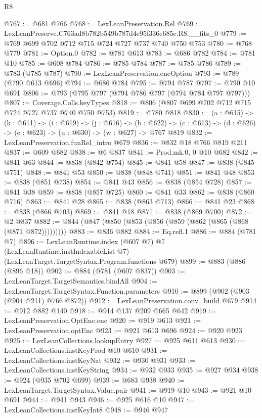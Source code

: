 \begin{lexlean}{R8}
\begin{coremodule}
@767 := @681 @766
@768 := LexLeanPreservation.Rel
@769 := LexLeanPreserve.C763ad8b782b549b787d4e95f336e685e.R8.__fits_0
@779 := @769 @699 @702 @712 @715 @724 @727 @737 @740 @750 @753
@780 := @768 @779
@781 := Option.{0}
@782 := @781 @613
@783 := @686 @782
@784 := @781 @10
@785 := @608 @784
@786 := @785 @784
@787 := @785 @786
@789 := @783 (@785 @787)
@790 := LexLeanPreservation.encOption
@793 := @789 (@790 @613 @696)
@794 := @686 @784
@795 := @794 @787
@797 := @790 @10 @691
@806 := @793 (@795 @797 (@794 @786 @797 (@794 @784 @797 @797)))
@807 := Coverage.Colls.keyTypes
@818 := @806 (@807 @699 @702 @712 @715 @724 @727 @737 @740 @750 @753)
@819 := @780 @818
@830 := (a : @615) ->
  (k : @611) ->
  (i : @619) ->
  (j : @616) ->
  (b : @622) -> (c : @613) -> (d : @626) -> (e : @623) -> (u : @630) -> (w : @627) -> @767 @819
@832 := LexLeanPreservation.funRel_intro @679
@836 := @832 @18 @766 @819 @211
@837 := @609 @682
@838 := @6 @837
@841 := Prod.mk.{0, 0} @10 @682
@842 := @841 @63
@844 := @838 (@842 @754)
@845 := @841 @58
@847 := @838 (@845 @751)
@848 := @841 @53
@850 := @838 (@848 @741)
@851 := @841 @48
@853 := @838 (@851 @738)
@854 := @841 @43
@856 := @838 (@854 @728)
@857 := @841 @38
@859 := @838 (@857 @725)
@860 := @841 @33
@862 := @838 (@860 @716)
@863 := @841 @28
@865 := @838 (@863 @713)
@866 := @841 @23
@868 := @838 (@866 @703)
@869 := @841 @18
@871 := @838 (@869 @700)
@872 := @2 @837
@882 := @844 (@847 (@850 (@853 (@856 (@859 (@862 (@865 (@868 (@871 @872)))))))))
@883 := @836 @882
@884 := Eq.refl.{1}
@886 := @884 (@781 @7)
@896 := LexLeanRuntime.index
    (@607 @7)
    @7
    (LexLeanRuntime.instIndexableList @7)
    (LexLeanTarget.TargetSyntax.Program.functions @679)
@899 := @883 (@886 (@896 @18))
@902 := @884 (@781 (@607 @837))
@903 := LexLeanTarget.TargetSemantics.bindAll
@904 := LexLeanTarget.TargetSyntax.Function.parameters
@910 := @899 (@902 (@903 (@904 @211) @766 @872))
@912 := LexLeanPreservation.conv_build @679
@914 := @912 @882 @140
@918 := @914 @137 @209 @665 @642
@919 := LexLeanPreservation.OptEnc.enc
@920 := @919 @613
@921 := LexLeanPreservation.optEnc
@923 := @921 @613 @696
@924 := @920 @923
@925 := LexLeanCollections.lookupEntry
@927 := @925 @611 @613
@930 := LexLeanCollections.instKeyProd @10 @610
@931 := LexLeanCollections.instKeyNat
@932 := @930 @931
@933 := LexLeanCollections.instKeyString
@934 := @932 @933
@935 := @927 @934
@938 := @924 (@935 @702 @699)
@939 := @683 @938
@940 := LexLeanTarget.TargetSyntax.Value.pair
@941 := @919 @10
@943 := @921 @10 @691
@944 := @941 @943
@946 := @925 @616 @10
@947 := LexLeanCollections.instKeyInt8
@948 := @946 @947

\end{coremodule}
\end{lexlean}
